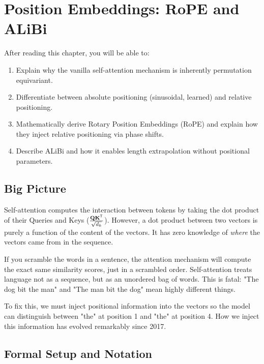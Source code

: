 \chapter{Position Embeddings: RoPE and ALiBi}
\label{ch:11}

\begin{keyinsight}
After reading this chapter, you will be able to:
\begin{enumerate}
  \item Explain why the vanilla self-attention mechanism is inherently permutation equivariant.
  \item Differentiate between absolute positioning (sinusoidal, learned) and relative positioning.
  \item Mathematically derive Rotary Position Embeddings (RoPE) and explain how they inject relative positioning via phase shifts.
  \item Describe ALiBi and how it enables length extrapolation without positional parameters.
\end{enumerate}
\end{keyinsight}

\section{Big Picture}
\label{ch:11:sec:big_picture}

Self-attention computes the interaction between tokens by taking the dot product of their Queries and Keys ($\frac{\mathbf{Q} \mathbf{K}^{\mathsf{T}}}{\sqrt{d_k}}$). However, a dot product between two vectors is purely a function of the content of the vectors. It has zero knowledge of \emph{where} the vectors came from in the sequence.

If you scramble the words in a sentence, the attention mechanism will compute the exact same similarity scores, just in a scrambled order. Self-attention treats language not as a sequence, but as an unordered bag of words. This is fatal: "The dog bit the man" and "The man bit the dog" mean highly different things.

To fix this, we must inject positional information into the vectors so the model can distinguish between "the" at position 1 and "the" at position 4. How we inject this information has evolved remarkably since 2017.

\section{Formal Setup and Notation}
\label{ch:11:sec:setup}

